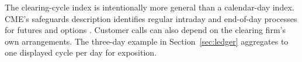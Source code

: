 The clearing-cycle index is intentionally more general than a calendar-day index. CME's safeguards description identifies regular intraday and end-of-day processes for futures and options \citep{CMESafeguards}. Customer calls can also depend on the clearing firm's own arrangements. The three-day example in Section~\ref{sec:ledger} aggregates to one displayed cycle per day for exposition.
\FloatBarrier
